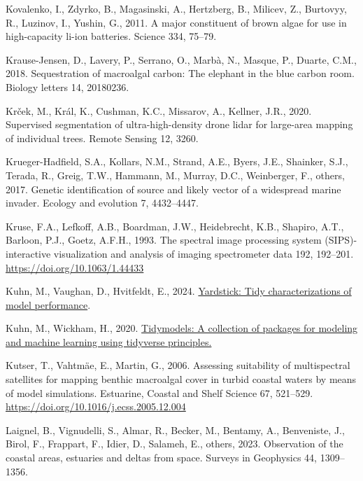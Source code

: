 \documentclass[
  letterpaper,
  11pt,
  english,
  singlespacing,
  headsepline]{MastersDoctoralThesis}
\newlength{\cslhangindent}
\newenvironment{CSLReferences}[2] %
 {\begin{list}{}{%
  \setlength{\itemindent}{0pt}
  \setlength{\leftmargin}{0pt}
  \setlength{\parsep}{0pt}
  \ifodd #1
   \setlength{\leftmargin}{\cslhangindent}
   \setlength{\itemindent}{-1\cslhangindent}
  \fi
  \setlength{\itemsep}{#2\baselineskip}}}
 {\end{list}}
\begin{document}
\begin{CSLReferences}{1}{0}
Kovalenko, I., Zdyrko, B., Magasinski, A., Hertzberg, B., Milicev, Z.,
Burtovyy, R., Luzinov, I., Yushin, G., 2011. A major constituent of
brown algae for use in high-capacity li-ion batteries. Science 334,
75--79.

Krause-Jensen, D., Lavery, P., Serrano, O., Marbà, N., Masque, P.,
Duarte, C.M., 2018. Sequestration of macroalgal carbon: The elephant in
the blue carbon room. Biology letters 14, 20180236.

Krček, M., Král, K., Cushman, K.C., Missarov, A., Kellner, J.R., 2020.
Supervised segmentation of ultra-high-density drone lidar for large-area
mapping of individual trees. Remote Sensing 12, 3260.

Krueger-Hadfield, S.A., Kollars, N.M., Strand, A.E., Byers, J.E.,
Shainker, S.J., Terada, R., Greig, T.W., Hammann, M., Murray, D.C.,
Weinberger, F., others, 2017. Genetic identification of source and
likely vector of a widespread marine invader. Ecology and evolution 7,
4432--4447.

Kruse, F.A., Lefkoff, A.B., Boardman, J.W., Heidebrecht, K.B., Shapiro,
A.T., Barloon, P.J., Goetz, A.F.H., 1993. {The spectral image processing
system (SIPS)-interactive visualization and analysis of imaging
spectrometer data} 192, 192--201. \url{https://doi.org/10.1063/1.44433}

Kuhn, M., Vaughan, D., Hvitfeldt, E., 2024.
\href{https://CRAN.R-project.org/package=yardstick}{Yardstick: Tidy
characterizations of model performance}.

Kuhn, M., Wickham, H., 2020.
\href{https://www.tidymodels.org}{Tidymodels: A collection of packages
for modeling and machine learning using tidyverse principles.}

Kutser, T., Vahtmäe, E., Martin, G., 2006. {Assessing suitability of
multispectral satellites for mapping benthic macroalgal cover in turbid
coastal waters by means of model simulations}. Estuarine, Coastal and
Shelf Science 67, 521--529.
\url{https://doi.org/10.1016/j.ecss.2005.12.004}

Laignel, B., Vignudelli, S., Almar, R., Becker, M., Bentamy, A.,
Benveniste, J., Birol, F., Frappart, F., Idier, D., Salameh, E., others,
2023. Observation of the coastal areas, estuaries and deltas from space.
Surveys in Geophysics 44, 1309--1356.


\end{CSLReferences}
\end{document}
